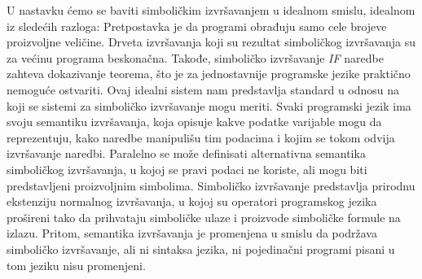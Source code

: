 \documentclass[a4paper]{article}
\begin{document}
U nastavku ćemo se baviti simboličkim izvršavanjem u idealnom smislu, idealnom iz sledećih razloga:
Pretpostavka je da programi obrađuju samo cele brojeve proizvoljne veličine. Drveta izvršavanja koji su rezultat simboličkog izvršavanja su za većinu programa beskonačna. Takođe, simboličko izvršavanje \textit{IF} naredbe zahteva dokazivanje teorema, što je za jednostavnije programske jezike praktično nemoguće ostvariti. Ovaj idealni sistem nam predstavlja standard u odnosu na koji se sistemi za simboličko izvršavanje mogu meriti. Svaki programski jezik ima svoju semantiku izvršavanja, koja opisuje kakve podatke varijable mogu da reprezentuju, kako naredbe manipulišu tim podacima i kojim se tokom odvija izvršavanje naredbi. Paralelno se može definisati alternativna semantika simboličkog izvršavanja, u kojoj se pravi podaci ne koriste, ali mogu biti predstavljeni proizvoljnim simbolima. Simboličko izvršavanje predstavlja prirodnu ekstenziju normalnog izvršavanja, u kojoj su operatori programskog jezika prošireni tako da prihvataju simboličke ulaze i proizvode simboličke formule na izlazu. Pritom, semantika izvršavanja je promenjena u smislu da podržava simboličko izvršavanje, ali ni sintaksa jezika, ni pojedinačni programi pisani u tom jeziku nisu promenjeni. \\
 
\end{document}
